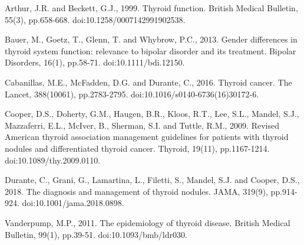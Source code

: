 \documentclass[12pt]{article}
\begin{document}
\newpage


\begin{thebibliography}{99}
   Arthur, J.R. and Beckett, G.J., 1999. Thyroid function. British Medical Bulletin, 55(3), pp.658-668. doi:10.1258/0007142991902538.

    Bauer, M., Goetz, T., Glenn, T. and Whybrow, P.C., 2013. Gender differences in thyroid system function: relevance to bipolar disorder and its treatment. Bipolar Disorders, 16(1), pp.58-71. doi:10.1111/bdi.12150.
    
    Cabanillas, M.E., McFadden, D.G. and Durante, C., 2016. Thyroid cancer. The Lancet, 388(10061), pp.2783-2795. doi:10.1016/s0140-6736(16)30172-6.

    Cooper, D.S., Doherty, G.M., Haugen, B.R., Kloos, R.T., Lee, S.L., Mandel, S.J., Mazzaferri, E.L., McIver, B., Sherman, S.I. and Tuttle, R.M., 2009. Revised American thyroid association management guidelines for patients with thyroid nodules and differentiated thyroid cancer. Thyroid, 19(11), pp.1167-1214. doi:10.1089/thy.2009.0110.
    
    Durante, C., Grani, G., Lamartina, L., Filetti, S., Mandel, S.J. and Cooper, D.S., 2018. The diagnosis and management of thyroid nodules. JAMA, 319(9), pp.914-924. doi:10.1001/jama.2018.0898.

    Vanderpump, M.P., 2011. The epidemiology of thyroid disease. British Medical Bulletin, 99(1), pp.39-51. doi:10.1093/bmb/ldr030.
\end{thebibliography}
\end{document}
